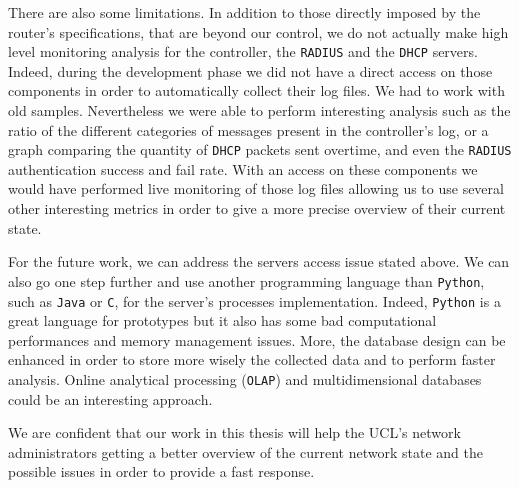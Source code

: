 There are also some limitations. In addition to those directly imposed by the router's specifications, that are beyond our control, we do not actually make high level monitoring analysis for the controller, the \texttt{RADIUS} and the \texttt{DHCP} servers. Indeed, during the development phase we did not have a direct access on those components in order to automatically collect their log files. We had to work with old samples. Nevertheless we were able to perform interesting analysis such as the ratio of the different categories of messages present in the controller's log, or a graph comparing the quantity of \texttt{DHCP} packets sent overtime, and even the \texttt{RADIUS} authentication success and fail rate. With an access on these components we would have performed live monitoring of those log files allowing us to use several other interesting metrics in order to give a more precise overview of their current state.

For the future work, we can address the servers access issue stated above. We can also go one step further and use another programming language than \texttt{Python}, such as \texttt{Java} or \texttt{C}, for the server's processes implementation. Indeed, \texttt{Python} is a great language for prototypes but it also has some bad computational performances and memory management issues. More, the database design can be enhanced in order to store more wisely the collected data and to perform faster analysis. Online analytical processing (\texttt{OLAP}) and multidimensional databases could be an interesting approach. 

We are confident that our work in this thesis will help the UCL's network administrators getting a better overview of the current network state and the possible issues in order to provide a fast response.





